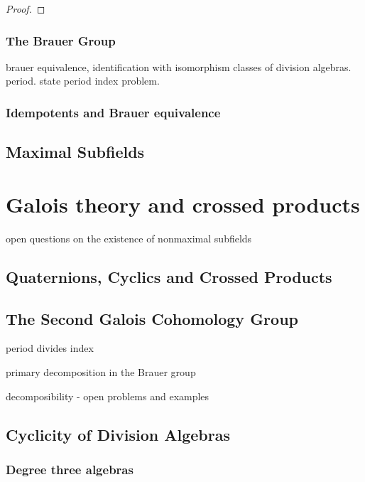 \documentclass[12pt]{report}
\theoremstyle{plain}
\newcommand{\todo}[1]{\textcolor{todo}{#1}}
\begin{document}
\begin{proof}
\end{proof}

\subsection{The Brauer Group}

\todo{
brauer equivalence, identification with isomorphism classes of division
algebras. period. state period index problem.
}

\subsection{Idempotents and Brauer equivalence}

\section{Maximal Subfields}


\chapter{Galois theory and crossed products}

\iffalse

\todo{open questions on the existence of nonmaximal subfields}

\section{Quaternions, Cyclics and Crossed Products}

\section{The Second Galois Cohomology Group}

\todo{period divides index}

\todo{primary decomposition in the Brauer group}

\todo{decomposibility - open problems and examples}

\section{Cyclicity of Division Algebras}

\subsection{Degree three algebras}
\end{document}
